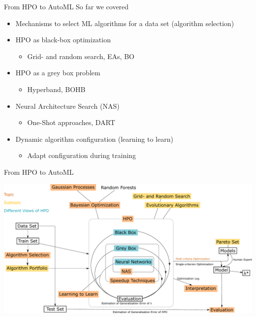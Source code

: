 

\usepackage[normalem]{ulem}
\usepackage{pifont}
\usepackage{relsize}
\renewcommand{\lit}[1]{{\smaller\color{black!60}[#1]}}
\subtitle{Wrap Up}




\maketitle



\begin{frame}{From HPO to AutoML}
  So far we covered
  \begin{itemize}
    \item Mechanisms to select ML algorithms for a data set (algorithm selection)
    \item HPO as black-box optimization
    \begin{itemize}
      \item Grid- and random search, EAs, BO
    \end{itemize}
    \item HPO as a grey box problem
    \begin{itemize}
      \item Hyperband, BOHB
    \end{itemize}
    \item Neural Architecture Search (NAS)
    \begin{itemize}
      \item One-Shot approaches, DART
    \end{itemize}
    \item Dynamic algorithm configuration (learning to learn)
    \begin{itemize}
      \item Adapt configuration during training
    \end{itemize}
  \end{itemize}  
\end{frame}

\begin{frame}{From HPO to AutoML}
    \begin{center}
      \includegraphics[width = 0.9\linewidth]{images/drawing.pdf}  
    \end{center}
\end{frame}

